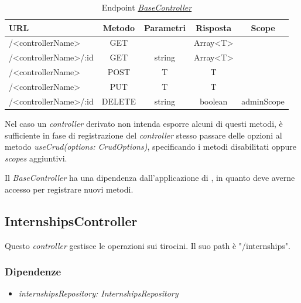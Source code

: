 \begin{table}[h]
    \ttfamily
    \caption{Endpoint \hyperref[server:base-controller]{\textit{BaseController}}}
    \centering
    \label{table:endpoints}
    \begin{tabular}{l c c c c}    
    URL  & Metodo & Parametri  & Risposta & Scope \\ 
	    \midrule
	    /<controllerName> & GET &  & Array<T>   \\
	    /<controllerName>/:id & GET & string & Array<T>   \\
	    /<controllerName> & POST & T & T  \\
	    /<controllerName> & PUT & T & T  \\
	    /<controllerName>/:id & DELETE & string & boolean  & adminScope \\
	    \bottomrule
    \end{tabular}
\end{table}

\noindent
Nel caso un \textit{controller} derivato non intenda esporre alcuni di questi metodi, è sufficiente in fase di registrazione del \textit{controller} stesso passare delle opzioni al metodo \textit{useCrud(options: CrudOptions)}, specificando i metodi disabilitati oppure \textit{scopes} aggiuntivi.

Il \textit{BaseController} ha una dipendenza dall'applicazione di \expressjs, in quanto deve averne accesso per registrare nuovi metodi.

\subsection{InternshipsController}
Questo \textit{controller} gestisce le operazioni sui tirocini. Il suo path è "/internships".
\subsubsection{Dipendenze}
\begin{itemize}[itemsep=0pt]
	\item \textit{internshipsRepository: InternshipsRepository}
\end{itemize}
